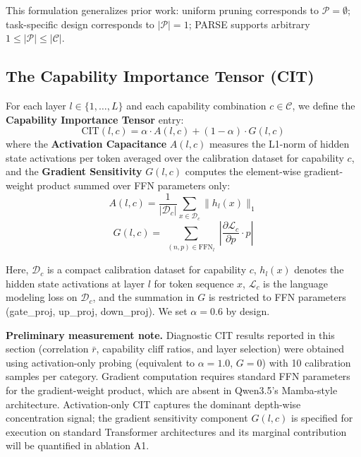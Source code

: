 \documentclass[twocolumn]{article}
\begin{document}
This formulation generalizes prior work: uniform pruning corresponds to $\mathcal{P} = \emptyset$; task-specific design corresponds to $|\mathcal{P}| = 1$; PARSE supports arbitrary $1 \leq |\mathcal{P}| \leq |\mathcal{C}|$.

\subsection{The Capability Importance Tensor (CIT)}

For each layer $l \in \{1, \ldots, L\}$ and each capability combination $c \in \mathcal{C}$, we define the \textbf{Capability Importance Tensor} entry:
\begin{equation}
\text{CIT}(l, c) = \alpha \cdot A(l, c) + (1-\alpha) \cdot G(l, c)
\end{equation}
where the \textbf{Activation Capacitance} $A(l, c)$ measures the L1-norm of hidden state activations per token averaged over the calibration dataset for capability $c$, and the \textbf{Gradient Sensitivity} $G(l, c)$ computes the element-wise gradient-weight product summed over FFN parameters only:
\begin{equation}
A(l, c) = \frac{1}{|\mathcal{D}_c|} \sum_{x \in \mathcal{D}_c} \|h_l(x)\|_1
\end{equation}
\begin{equation}
G(l, c) = \sum_{\substack{(n, p) \in \text{FFN}_l}} \left|\frac{\partial \mathcal{L}_c}{\partial p} \cdot p\right|
\end{equation}

Here, $\mathcal{D}_c$ is a compact calibration dataset for capability $c$, $h_l(x)$ denotes the hidden state activations at layer $l$ for token sequence $x$, $\mathcal{L}_c$ is the language modeling loss on $\mathcal{D}_c$, and the summation in $G$ is restricted to FFN parameters (gate\_proj, up\_proj, down\_proj).
We set $\alpha = 0.6$ by design.

\textbf{Preliminary measurement note.}
Diagnostic CIT results reported in this section (correlation $\bar{r}$, capability cliff ratios, and layer selection) were obtained using activation-only probing (equivalent to $\alpha = 1.0$, $G=0$) with 10 calibration samples per category. Gradient computation requires standard FFN parameters for the gradient-weight product, which are absent in Qwen3.5's Mamba-style architecture. Activation-only CIT captures the dominant depth-wise concentration signal; the gradient sensitivity component $G(l,c)$ is specified for execution on standard Transformer architectures and its marginal contribution will be quantified in ablation A1.
\end{document}
